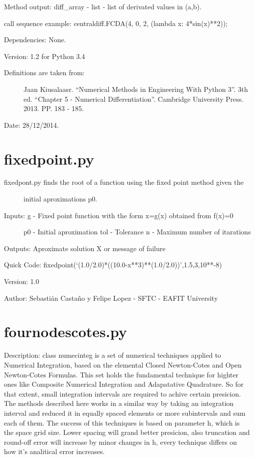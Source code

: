 \documentclass[letterpaper,10pt,oneside]{sphinxmanual}
\theoremstyle{plain}%
\theoremstyle{definition}%
\theoremstyle{remark}%
\begin{document}
Method output: diff\_array - list - list of derivated values in (a,b).

call sequence example: centraldiff.FCDA(4, 0, 2, (lambda x: 4*sin(x)**2));

Dependencies: None.

Version: 1.2 for Python 3.4
\begin{description}
\item[{Definitions are taken from:}] \leavevmode
Jaan Kiusalaasr. ``Numerical Methods in Engineering With Python 3''.
3th ed. ``Chapter 5 - Numerical Differentiation''. 
Cambridge University Press. 2013. PP. 183 - 185.

\end{description}




Date: 28/12/2014.


\section{fixedpoint.py}
\label{code:module-fixedpoint}\label{code:fixedpoint-py}\begin{description}
\item[{fixedpont.py finds the root of a function using the fixed point method given the}] \leavevmode
initial aproximations p0.

\item[{Inputs: g - Fixed point function with the form x=g(x) obtained from f(x)=0}] \leavevmode
p0 - Initial aproximation
tol - Tolerance
n - Maximum number of itarations

\end{description}

Outputs: Aproximate solution X or message of failure

Quick Code: fixedpoint(`(1.0/2.0)*((10.0-x**3)**(1.0/2.0))',1.5,3,10**-8)

Version: 1.0

Author: Sebastián Castaño y Felipe Lopez - SFTC - EAFIT University


\section{fournodescotes.py}
\label{code:fournodescotes-py}\label{code:module-fournodescotes}
Description: class numecinteg is a set of numerical techniques applied to
Numerical Integration, based on the elemental Closed Newton-Cotes and
Open Newton-Cotes Formulas. This set holds the fundamental technique for
highter ones like Composite Numerical Integration and Adapatative Quadrature.
So for that extent, small integration intervals are required to achive certain
presicion. The methods described here works in a similar way by taking an
integration interval and reduced it in equally spaced elements or more 
subintervals and sum each of them. The success of this techniques is based
on parameter h, which is the space grid size. Lower spacing will grand better
presicion, also truncation and round-off error will increase by minor changes
in h, every technique differs on how it's analitical error increases.
\end{document}
